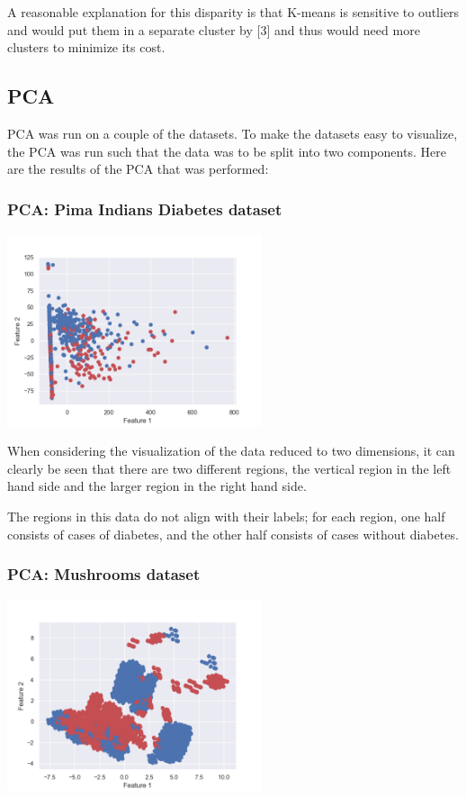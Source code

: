 \documentclass[11pt]{article}
\begin{document}
            A reasonable explanation for this disparity is that
            K-means is sensitive to outliers and would put them in a separate
            cluster by [3] and thus would need more clusters to minimize its cost.


            
            \subsection{PCA}

                PCA was run on a couple of the datasets. To make the datasets easy to visualize, the
                PCA was run such that the data was to be split into two components. Here are the
                results of the PCA that was performed:

            \subsubsection{PCA: Pima Indians Diabetes dataset}

            \includegraphics[width=7.5cm]{../pima/pca/diabetes_pca.png}

            When considering the visualization of the data reduced to two dimensions,
            it can clearly be seen that there are two different regions, the vertical
            region in the left hand side and the larger region in the right hand side.

            The regions in this data do not align with their labels; for each region,
            one half consists of cases of diabetes, and the other half consists of cases
            without diabetes.

            \subsubsection{PCA: Mushrooms dataset}

            \includegraphics[width=7.5cm]{../mushrooms/pca/mushrooms_pca.png}
\end{document}
